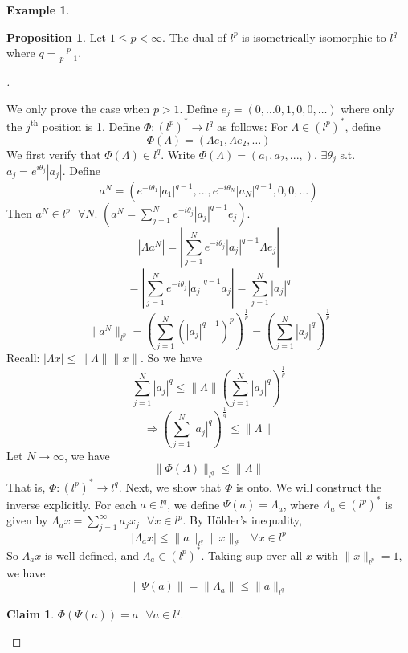 \documentclass{article}
\newcommand{\sfa}{\text{  } \forall}
\theoremstyle{definition}
\newtheorem{ex}{Example}
\newtheorem{prop}{Proposition}
\newtheorem*{clm}{Claim}
\newenvironment{proofs}[1][\proofname]{%
  \begin{proof}[#1]$ $\par\nobreak\ignorespaces
}{%
  \end{proof}
}
\begin{document}
\begin{ex}
	\begin{prop}
		Let $1 \leq p < \infty$. The dual of $l^p$ is isometrically isomorphic to $l^q$ where $q = \frac{p}{p - 1}$.
	\end{prop}

	\begin{proofs}
		We only prove the case when $p > 1$. 
		Define $e_j = (0, \hdots 0, 1, 0, 0, \hdots)$ where only the $j^{\text{th}}$ position is 1.
		Define $\Phi: (l^p)^* \to l^q$ as follows:
		For $\Lambda \in (l^p)^*$, define 
		\[
			\Phi(\Lambda) = (\Lambda e_1, \Lambda e_2, \hdots )
		\]
		We first verify that $\Phi(\Lambda) \in l^q$.
		Write $\Phi(\Lambda)= (a_1, a_2, ...,)$.
		$\exists \theta_j$ s.t. $a_j = e^{i \theta_j} |a_j|$.
		Define 
		\[
			a^N = (e^{-i \theta_1}|a_1|^{q-1}, ..., e^{-i \theta_N}|a_N|^{q- 1}, 0, 0, ...)
		\]
		Then $a^N \in l^p \sfa N$.
		$(a^N = \sum_{j = 1}^N e^{-i \theta_j} |a_j|^{q - 1} e_j)$.
		\[
			|\Lambda a^N| = \left| \sum_{j = 1}^N e^{-i \theta_j} |a_j|^{q - 1} \Lambda e_j\right|
		\]
		\[
			= \left|\sum_{j =1}^N e^{-i \theta_j} |a_j|^{q - 1} a_j\right| = \sum_{j = 1}^N |a_j|^q
		\]
		\[
			\|a^N\|_{l^p} = \left( \sum_{j = 1}^N \left(|a_j|^{q - 1}\right)^{p} \right)^{\frac{1}{p}} = \left( \sum_{j = 1}^N |a_j|^q \right)^{\frac{1}{p}} 
		\]
		Recall: $|\Lambda x| \leq \|\Lambda \| \|x\|$.
		So we have 
		\[
			\sum_{j = 1}^N |a_j|^q \leq \|\Lambda\|\left(\sum_{j = 1}^N |a_j|^q\right)^{\frac{1}{p}}
		\]
		\[
			\Rightarrow \left( \sum_{j = 1}^N |a_j|^q\right)^{\frac{1}{q}} \leq \|\Lambda\|
		\]
		Let $N \to \infty$, we have
		\[
			\|\Phi(\Lambda)\|_{l^q} \leq \|\Lambda \|
		\]
		That is, $\Phi:(l^p)^* \to l^q$.
		Next, we show that $\Phi$ is onto.
		We will construct the inverse explicitly.
		For each $a \in l^q$, we define $\Psi(a) = \Lambda_a$, where $\Lambda_a \in (l^p)^*$ is given by $\Lambda_a x = \sum_{j = 1}^\infty a_j x_j \sfa x \in l^p$.
		By H\"older's inequality, 
		\[
			|\Lambda_a x| \leq \|a\|_{l^q} \|x\|_{l^p} \sfa x \in l^p
		\]
		So $\Lambda_a x$ is well-defined, and $\Lambda_a \in (l^p)^*$.
		Taking sup over all $x$ with $\|x\|_{l^p} = 1$, we have 
		\[
			\|\Psi(a)\| = \|\Lambda_a\| \leq \|a\|_{l^q}
		\]

		\begin{clm}
			$\Phi(\Psi(a)) = a \sfa a \in l^q$.
		\end{clm}


\end{proofs}
\end{ex}
\end{document}
